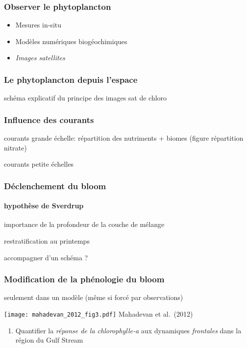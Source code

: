 \begin{frame}
  \frametitle{Observer le phytoplancton}
  {
    \centering
  }

  \begin{itemize}
    \item<2-> Mesures in-situ
    \item<3-> Modèles numériques biogéochimiques
    \item<4-> \emph{Images satellites}
  \end{itemize}
\end{frame}

\begin{frame}
  \frametitle{Le phytoplancton depuis l'espace}
  schéma explicatif du principe des images sat de chloro
\end{frame}

\begin{frame}
  \frametitle{Influence des courants}
  courants grande échelle: répartition des nutriments + biomes (figure répartition nitrate)

  courants petite échelles
\end{frame}

\subsubsection{}

\begin{frame}
  \frametitle{Déclenchement du bloom}
  \framesubtitle{hypothèse de Sverdrup}
  importance de la profondeur de la couche de mélange

  restratification au printemps

  accompagner d'un schéma ?
\end{frame}

\begin{frame}
  \frametitle{Modification de la phénologie du bloom}
  seulement dans un modèle (même si forcé par observations)

  \texttt{[image: mahadevan\_2012\_fig3.pdf]}
  Mahadevan et al.\ (2012)
\end{frame}



\begin{frame}
  \vspace{2em}

  \begin{enumerate}
    \setlength{\itemsep}{1em}
    \item Quantifier la \emph{réponse de la chlorophylle-a} aux dynamiques \emph{frontales} dans la région du Gulf Stream
  \end{enumerate}
\end{frame}

